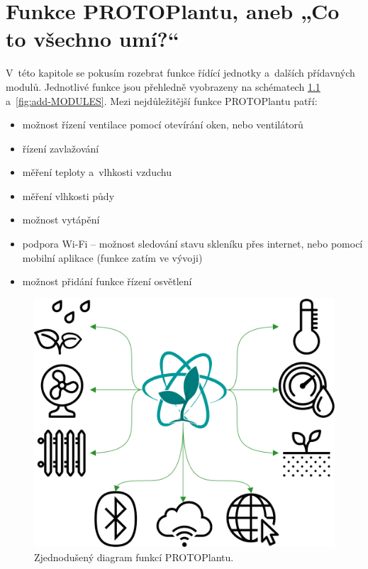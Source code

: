 \chapter{Funkce PROTOPlantu, aneb „Co to všechno umí?“}
V~této kapitole se pokusím rozebrat funkce řídící jednotky a~dalších přídavných modulů.
Jednotlivé funkce jsou přehledně vyobrazeny na schématech \ref{fig:FEATURES_WHOLE_SMALL} a~\ref{fig:add-MODULES}.
Mezi nejdůležitější funkce PROTOPlantu patří:
\begin{itemize}
    \item možnost řízení ventilace pomocí otevírání oken, nebo ventilátorů
    \item řízení zavlažování
    \item měření teploty a~vlhkosti vzduchu
    \item měření vlhkosti půdy
    \item možnost vytápění
    \item podpora Wi-Fi -- možnost sledování stavu skleníku přes internet, nebo pomocí mobilní aplikace (funkce zatím ve vývoji)
    \item možnost přidání funkce řízení osvětlení
\end{itemize}

\begin{figure}[htbp]
    \centering
    \includegraphics[scale=0.7]{img/FUNCTIONS/PROTOPLANT_FC.png}
    \caption{Zjednodušený diagram funkcí PROTOPlantu.}
    \label{fig:FEATURES_WHOLE_SMALL}
\end{figure}

